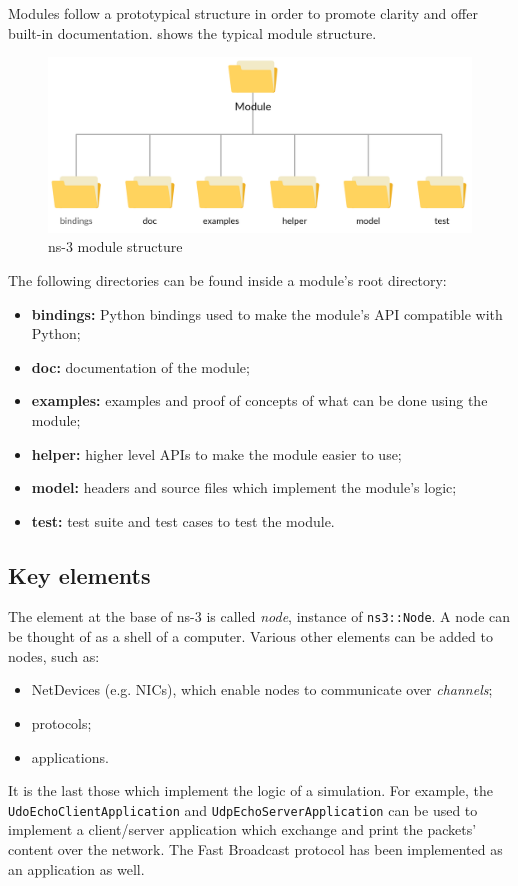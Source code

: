 			
			Modules follow a prototypical structure in order to promote clarity and offer built-in documentation.  shows the typical module structure.
			
			\begin{figure}[H]
				\centering
				\includegraphics[width=\textwidth]{immagini/ns-3-module}
				\caption{ns-3 module structure}
				\label{fig:ns-3-module}
			\end{figure}
		
			The following directories can be found inside a module's root directory:
			\begin{itemize}
				\item \textbf{bindings:} Python bindings used to make the module's API compatible with Python;
				\item \textbf{doc:} documentation of the module;
				\item \textbf{examples:} examples and proof of concepts of what can be done using the module;
				\item \textbf{helper:} higher level APIs to make the module easier to use;
				\item \textbf{model:} headers and source files which implement the module's logic; 
				\item \textbf{test:} test suite and test cases to test the module.
			\end{itemize}
		
		\subsection{Key elements}
			The element at the base of ns-3 is called \textit{node}, instance of \texttt{ns3::Node}. A node can be thought of as a shell of a computer. Various other elements can be added to nodes, such as:
			\begin{itemize}
				\item NetDevices (e.g. NICs), which enable nodes to communicate over \textit{channels};
				\item protocols;
				\item applications. 
			\end{itemize}
			It is the last those which implement the logic of a simulation. For example, the \texttt{UdoEchoClientApplication} and \texttt{UdpEchoServerApplication} can be used to implement a client/server application which exchange and print the packets' content over the network. The Fast Broadcast protocol has been implemented as an application as well.
			
